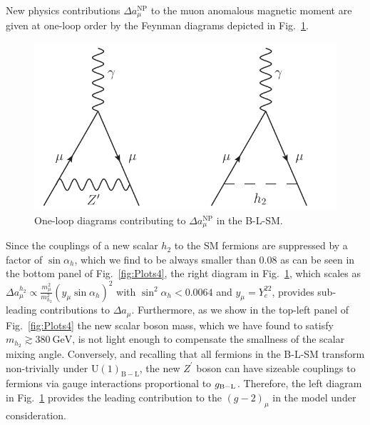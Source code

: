 \documentclass[a4paper,11pt]{article}
\renewcommand{\(}{\left(}
\renewcommand{\)}{\right)}
\renewcommand{\[}{\left[}
\renewcommand{\]}{\right]}
\newcommand{\U}[1]{\mathrm{U}(1)_{\mathrm{#1}}}			%
\newcommand{\ro}[1]{\textrm{#1}}
\begin{document}
New physics contributions $\Delta a_\mu^\ro{NP}$ to the muon anomalous magnetic moment are given at one-loop order by the Feynman diagrams depicted in Fig.~\ref{fig:g-2}.
\begin{figure}[!htb]
	\centering
	\includegraphics[scale=0.75]{g-2.pdf}
	\caption{One-loop diagrams contributing to $\Delta a_\mu^\ro{NP}$ in the B-L-SM.}
	\label{fig:g-2}
\end{figure}	
Since the couplings of a new scalar $h_2$ to the SM fermions are suppressed by a factor of $\sin \alpha_h$, which we find to be always smaller than $0.08$ as can be seen in the bottom panel of Fig.~\ref{fig:Plots4}, the right diagram in Fig.~\ref{fig:g-2}, which scales as $\Delta a_\mu^{h_2} \propto \tfrac{m_\mu^2}{m_{h_2}^2}\(y_\mu \sin \alpha_h\)^2$ with $\sin^2 \alpha_h < 0.0064$ and $y_\mu = Y_e^{22}$, provides sub-leading contributions to $\Delta a_\mu$. Furthermore, as we show in the top-left panel of Fig.~\ref{fig:Plots4} the new scalar boson mass, which we have found to satisfy $m_{h_2} \gtrsim 380~\ro{GeV}$, is not light enough to compensate the smallness of the scalar mixing angle. Conversely, and recalling that all fermions in the B-L-SM transform non-trivially under $\U{B-L}$, the new $Z^\prime$ boson can have sizeable couplings to fermions via gauge interactions proportional to $g_{\rm B-L}$. Therefore, the left diagram in Fig.~\ref{fig:g-2} provides the leading contribution to the $\left(g-2\right)_\mu$ in the model under consideration.
\end{document}
